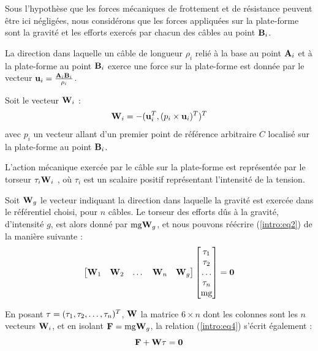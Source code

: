 Sous l'hypothèse que les forces mécaniques de frottement et de résistance 
peuvent être ici négligées, nous considérons que les forces appliqu\'ees sur la 
plate-forme sont la gravit\'e et les efforts exercés par chacun des câbles au 
point ${\bf B}_i$.

La direction dans laquelle un câble de longueur $\rho_i$ relié à la base au 
point ${\bf A}_i$ et à la plate-forme au point ${\bf B}_i$ exerce une force sur 
la plate-forme est donnée par le vecteur ${\bf u}_i = \frac{{\bf A}_i{\bf 
B}_i}{\rho_i}$.

Soit le vecteur ${\bf W}_i$ :
\begin{equation}
{\bf W}_i = -({\bf u}_i^T, (p_i \times {\bf u}_i)^T)^T
\label{intro:eq3}
\end{equation}
avec $p_i$ un vecteur allant d'un premier point de référence arbitraire 
$C$ localisé sur la plate-forme au point ${\bf B}_i$.

L'action m\'ecanique exercée par le câble sur la plate-forme est représentée par 
le torseur $ \tau_i {\bf W}_i$ , où $\tau_i$ est un scalaire positif 
représentant l'intensité de la tension.

Soit ${\bf W}_g$ le vecteur indiquant la direction dans laquelle la gravité est 
exercée dans le référentiel choisi, pour $n$ câbles. Le torseur des efforts 
d\^us à la gravité, d'intensit\'e $g$, est alors donné par $\hbox{mg} {\bf 
W}_g$, et nous pouvons réécrire (\ref{intro:eq2}) de la manière suivante :
\begin{equation}
\begin{bmatrix}
 {\bf W}_1 & {\bf W}_2 & \dots & {\bf W}_n & {\bf W}_g
\end{bmatrix}
\begin{bmatrix}
 \tau_1 \\ \tau_2 \\ \dots \\ \tau_n \\ \hbox{mg}
\end{bmatrix}
= {\bf 0}
\label{intro:eq4}
\end{equation}

En posant ${\bf \tau} = (\tau_1, \tau_2, \dots, \tau_n)^T$, ${\bf W}$ la 
matrice $6 \times n$ dont les colonnes sont les $n$ vecteurs ${\bf W}_i$, et 
en isolant $\mathcal {\bf F} = \hbox{mg} {\bf W}_g$, la relation 
(\ref{intro:eq4}) s'écrit également :
\begin{equation}
\mathcal {\bf F} + {\bf W} \tau = {\bf 0}
\label{intro:eq5a}
\end{equation}

